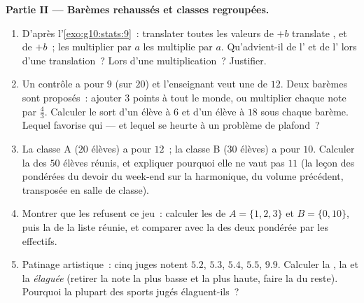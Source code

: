 \begin{problem}
\medskip
\noindent\textbf{Partie II --- Barèmes rehaussés et classes
regroupées.}
\begin{enumerate}[resume]
  \item D'après l'\cref{exo:g10:stats:9}~: translater toutes les
        valeurs de $+b$ translate ,  et  de
        $+b$~; les multiplier par $a$ les multiplie par $a$.
        Qu'advient-il de l' et de l' lors
        d'une translation~? Lors d'une multiplication~? Justifier.
  \item Un contrôle a pour  $9$ (sur $20$) et l'enseignant
        veut une  de $12$. Deux barèmes sont proposés~:
        ajouter $3$ points à tout le monde, ou multiplier chaque
        note par $\frac43$. Calculer le sort d'un élève à $6$ et
        d'un élève à $18$ sous chaque barème. Lequel favorise qui
        --- et lequel se heurte à un problème de plafond~?
  \item La classe A ($20$ élèves) a pour  $12$~; la classe B
        ($30$ élèves) a pour  $10$. Calculer la  des
        $50$ élèves réunis, et expliquer pourquoi elle ne vaut pas
        $11$ (la leçon des  pondérées du devoir du week-end
        sur la  harmonique, du volume précédent, transposée
        en salle de classe).
  \item Montrer que les  refusent ce jeu~: calculer les
         de $A = \{1, 2, 3\}$ et $B = \{0, 10\}$, puis la
         de la liste réunie, et comparer avec la  des
        deux  pondérée par les effectifs.
  \item Patinage artistique~: cinq juges notent $5.2$, $5.3$,
        $5.4$, $5.5$, $9.9$. Calculer la , la  et la
        \emph{ élaguée} (retirer la note la plus basse et la
        plus haute, faire la  du reste). Pourquoi la plupart
        des sports jugés élaguent-ils~?
\end{enumerate}


\end{problem}
